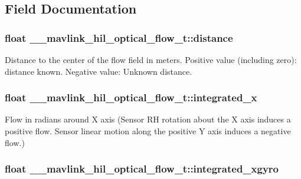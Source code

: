 \subsection{Field Documentation}
\hypertarget{struct____mavlink__hil__optical__flow__t_aee005c2910873d3010551bc9f7507fa5}{
\subsubsection[{distance}]{\setlength{\rightskip}{0pt plus 5cm}float \+\_\+\+\_\+mavlink\+\_\+hil\+\_\+optical\+\_\+flow\+\_\+t\+::distance}}\label{struct____mavlink__hil__optical__flow__t_aee005c2910873d3010551bc9f7507fa5}


Distance to the center of the flow field in meters. Positive value (including zero)\+: distance known. Negative value\+: Unknown distance. 

\hypertarget{struct____mavlink__hil__optical__flow__t_adc90349e5ff74dc81e4dac34c6a62351}{
\subsubsection[{integrated\+\_\+x}]{\setlength{\rightskip}{0pt plus 5cm}float \+\_\+\+\_\+mavlink\+\_\+hil\+\_\+optical\+\_\+flow\+\_\+t\+::integrated\+\_\+x}}\label{struct____mavlink__hil__optical__flow__t_adc90349e5ff74dc81e4dac34c6a62351}


Flow in radians around X axis (Sensor R\+H rotation about the X axis induces a positive flow. Sensor linear motion along the positive Y axis induces a negative flow.) 

\hypertarget{struct____mavlink__hil__optical__flow__t_af9231c53a38dafaac5bc1337e1cf0508}{
\subsubsection[{integrated\+\_\+xgyro}]{\setlength{\rightskip}{0pt plus 5cm}float \+\_\+\+\_\+mavlink\+\_\+hil\+\_\+optical\+\_\+flow\+\_\+t\+::integrated\+\_\+xgyro}}\label{struct____mavlink__hil__optical__flow__t_af9231c53a38dafaac5bc1337e1cf0508}


